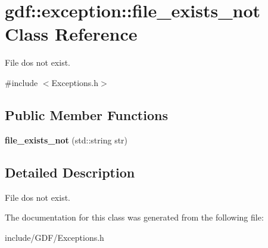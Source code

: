 \hypertarget{classgdf_1_1exception_1_1file__exists__not}{
\section{gdf::exception::file\_\-exists\_\-not Class Reference}
\label{classgdf_1_1exception_1_1file__exists__not}
}


File dos not exist.  




{\ttfamily \#include $<$Exceptions.h$>$}

\subsection*{Public Member Functions}
\begin{DoxyCompactItemize}
\item 
\hypertarget{classgdf_1_1exception_1_1file__exists__not_a6e60b81afdc785065f7250a9dac6c3f8}{
{\bfseries file\_\-exists\_\-not} (std::string str)}
\label{classgdf_1_1exception_1_1file__exists__not_a6e60b81afdc785065f7250a9dac6c3f8}

\end{DoxyCompactItemize}


\subsection{Detailed Description}
File dos not exist. 

The documentation for this class was generated from the following file:\begin{DoxyCompactItemize}
\item 
include/GDF/Exceptions.h\end{DoxyCompactItemize}
